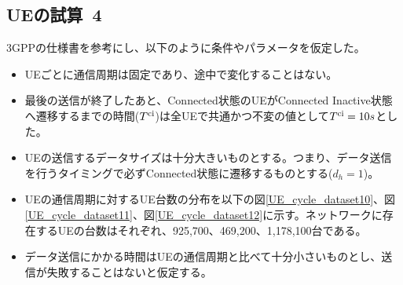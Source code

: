 \documentclass[a4j]{ujarticle}
\begin{document}
%
%

\clearpage
\subsection{UEの試算~4}
\label{sec:estimate4}
3GPPの仕様書\cite{3gpp.45.820}を参考にし、以下のように条件やパラメータを仮定した。
\begin{itemize}
  \item UEごとに通信周期は固定であり、途中で変化することはない。
  \item 最後の送信が終了したあと、Connected状態のUEがConnected Inactive状態へ遷移するまでの時間($T^{\rm ci}$)は全UEで共通かつ不変の値として$T^{\rm ci} = 10s$とした。
  \item UEの送信するデータサイズは十分大きいものとする。つまり、データ送信を行うタイミングで必ずConnected状態に遷移するものとする($d_h = 1$)。
  \item UEの通信周期に対するUE台数の分布を以下の図\ref{UE_cycle_dataset10}、図\ref{UE_cycle_dataset11}、図\ref{UE_cycle_dataset12}に示す。ネットワークに存在するUEの台数はそれぞれ、925,700、469,200、1,178,100台である。
  \item データ送信にかかる時間はUEの通信周期と比べて十分小さいものとし、送信が失敗することはないと仮定する。
\end{itemize}
\end{document}
